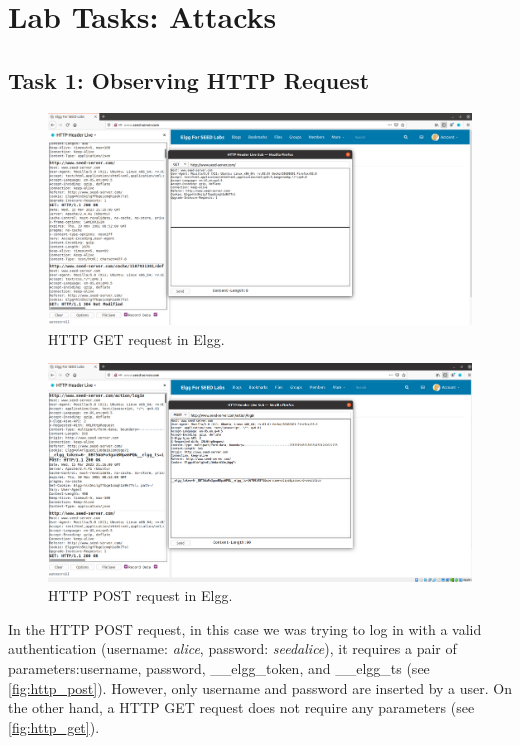 \section{Lab Tasks: Attacks}
\subsection{Task 1: Observing HTTP Request}
%
\begin{figure}
    \centering
    \includegraphics[width=\textwidth,height=\textheight,keepaspectratio]
    {figures/HTTP_GET.png}
    \caption{HTTP GET request in Elgg.}\label{fig:http_get}
\end{figure}

\begin{figure}
    \centering
    \includegraphics[width=\textwidth,height=\textheight,keepaspectratio]
    {figures/HTTP_POST.png}
    \caption{HTTP POST request in Elgg.}\label{fig:http_post}
\end{figure}

In the HTTP POST request, in this case we was trying to log in with a valid
authentication (username: \emph{alice}, password: \emph{seedalice}), it requires
a pair of parameters:{\selectfont username},
{\selectfont password}, {\selectfont \_\_elgg\_token}, and
{\selectfont \_\_elgg\_ts} (see \autoref{fig:http_post}). However, only
{\selectfont username} and {\selectfont password}
are inserted by a user.
On the other hand, a HTTP GET request does not require any parameters
(see \autoref{fig:http_get}).